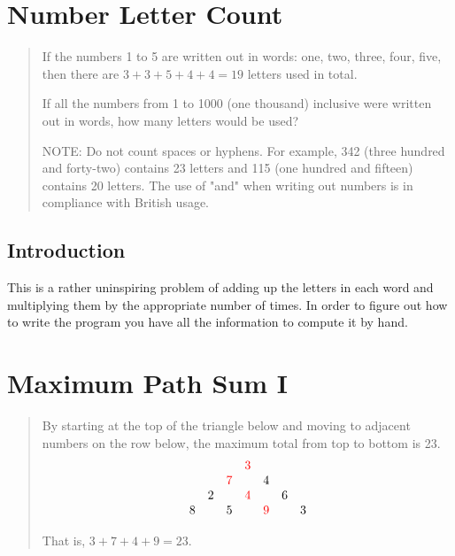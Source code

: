 \documentclass[oneside,12pt]{book}   	%
\newcounter{ex}
\newcounter{pr}
\theoremstyle{definition}
\begin{document}
\begin{spacing}{1.618}
			

	\chapter{Number Letter Count}
	
		\begin{quote}
			If the numbers 1 to 5 are written out in words: one, two, three, four, five, then there are $3 + 3 + 5 + 4 + 4 = 19$ letters used in total.

			If all the numbers from 1 to 1000 (one thousand) inclusive were written out in words, how many letters would be used?

			NOTE: Do not count spaces or hyphens. For example, 342 (three hundred and forty-two) contains 23 letters and 115 (one hundred and fifteen) contains 20 letters. The use of "and" when writing out numbers is in compliance with British usage.
		\end{quote}
	\section{Introduction}
		This is a rather uninspiring problem of adding up the letters in each word and multiplying them by the appropriate number of times. In order to figure out how to write the program you have all the information to compute it by hand. 
		
	\chapter{Maximum Path Sum I}
	
		\begin{quote}
			By starting at the top of the triangle below and moving to adjacent numbers on the row below, the maximum total from top to bottom is 23.
			\begin{alignat}{4}
				\begin{array}{ccccccc}
					&&&\textcolor{red}{3}&&& \\
					&&\textcolor{red}{7}&& 4&& \\
					&2&&\textcolor{red}{4}&& 6& \\
					8 && 5 && \textcolor{red}{9} && 3
				\end{array} \label{E:18:1}
			\end{alignat}

			That is, $3 + 7 + 4 + 9 = 23$.


\end{quote}
\end{spacing}
\end{document}
